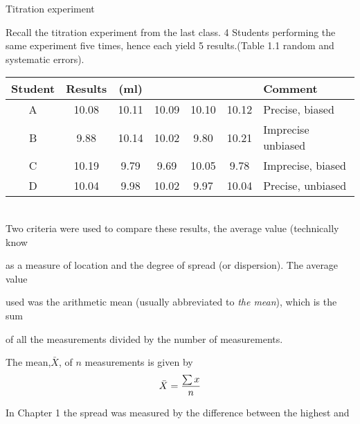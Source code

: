 

Titration experiment

 

Recall the titration experiment from the last class. 4 Students performing the same experiment five times, hence each yield 5 results.(Table 1.1 random and systematic errors).

\begin{tabular}{|c|ccccc|l|}

  \hline


Student & Results  & (ml) &  &  &  &Comment \\ \hline

A & 10.08 & 10.11 &10.09 &10.10&10.12 & Precise, biased\\ \hline

B & 9.88 &10.14& 10.02 &9.80& 10.21& Imprecise unbiased\\ \hline

C & 10.19 &9.79& 9.69 &10.05& 9.78 & Imprecise, biased\\ \hline

D & 10.04 &9.98 &10.02 &9.97 &10.04 & Precise, unbiased \\

  \hline

\end{tabular}\\

 









Two criteria were used to compare these results, the average value (technically know

as a measure of location and the degree of spread (or dispersion). The average value

used was the arithmetic mean (usually abbreviated to \emph{the mean}), which is the sum

of all the measurements divided by the number of measurements.

 



The mean,$\bar{X}$, of $n$ measurements is given by \[ \bar{X}  = {\sum{x} \over n} \]

 

In Chapter 1 the spread was measured by the difference between the highest and

